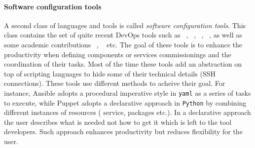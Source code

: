 \paragraph{Software configuration tools}
A second class of languages and tools is called \emph{software
  configuration tools}. This class contains the set of quite recent
DevOps tools such as \ansible~\cite{ansible:web},
\puppet~\cite{puppet:web}, \chef~\cite{chef:web},
\salt~\cite{salt:web}, as well as some academic contributions
\deployware~\cite{flissi2008ccgrid},
\aeolus~\cite{dicosmo2014ic,dicosmo:hal-01233489} etc. The goal of
these tools is to enhance the productivity when defining components or
services commissionings and the coordination of their tasks. Most of
the time these tools add an abstraction on top of scripting languages
to hide some of their technical details (\eg SSH connections). These
tools use different methods to acheive their goal. For instance,
Ansible adopts a procedural imperative style in \texttt{yaml} as a
series of tasks to execute, while Puppet adopts a declarative approach
in \texttt{Python} by combining different instances of resources (\ie
service, packages etc.). In a declarative approach the user describes
what is needed not how to get it which is left to the tool
developers. Such approach enhances productivity but reduces
flexibility for the user.

